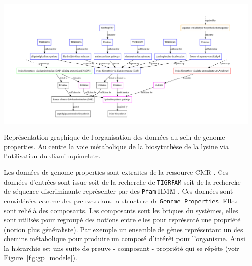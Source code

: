 \begin{refsegment}
    \begin{shadedfigure}[H]
        \centering
        \includegraphics[width=\textwidth]{img/lysine_biosynthesis.pdf}
        \caption{ Représentation graphique de l'organisation des données au sein de genome properties. Au centre la voie métabolique de la biosytnthèse de la lysine via l'utilisation du diaminopimelate. }
        \label{fig:gp_lysine}
    \end{shadedfigure}

    Les données de genome properties sont extraites de la ressource \acrfull{CMR} \cite{peterson2001comprehensive,davidsen2009comprehensive}. Ces données d'entrées sont issue soit de la recherche de \texttt{TIGRFAM} \cite{haft2003tigrfams}\label{key} soit de la recherche de séquence discriminante représenter par des \texttt{Pfam} \acrfull{HMM} \cite{bateman2000pfam,bateman2002pfam,bateman2004pfam,finn2008pfam,finn2009pfam,punta2011pfam,finn2013pfam,finn2016pfam}. Ces données sont considérées comme des preuves dans la structure de \texttt{Genome Properties}. Elles sont relié à des composants. Les composants sont les briques du systèmes, elles sont utilisés pour regroupé des notions entre elles pour représenté une propriété (notion plus généraliste). Par exemple un ensemble de gènes représentant un des chemins métabolique pour produire un composé d'intérêt pour l'organisme. Ainsi la hiérarchie est une suite de preuve - composant - propriété qui se répète (voir Figure~\cref{fig:gp_modele}).
    

\end{refsegment}
